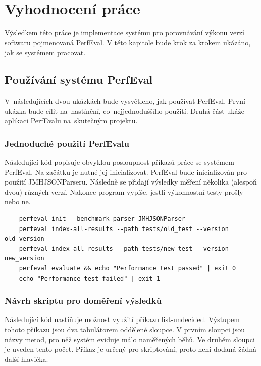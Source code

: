 \chapter{Vyhodnocení práce}

Výsledkem této práce je implementace systému pro porovnávání výkonu verzí softwaru
pojmenovaná PerfEval. V této kapitole bude krok za krokem ukázáno, jak se systémem pracovat.

\section{Používání systému PerfEval}

V~následujících dvou ukázkách bude vysvětleno, jak používat PerfEval. První ukázka bude
cílit na~nastínění, co~nejjednoduššího použití. Druhá část ukáže aplikaci PerfEvalu na~skutečným projektu.

\subsection*{Jednoduché použití PerfEvalu}

Následující kód popisuje obvyklou posloupnost příkazů práce se systémem PerfEval.
Na začátku je nutné jej inicializovat. PerfEval bude inicializován pro použití JMHJSONParseru.
Následně se přidají výsledky měření několika (alespoň dvou) různých verzí.
Nakonec program vypíše, jestli výkonnostní testy prošly nebo ne.

\begin{lstlisting}
    perfeval init --benchmark-parser JMHJSONParser
    perfeval index-all-results --path tests/old_test --version old_version
    perfeval index-all-results --path tests/new_test --version new_version
    perfeval evaluate && echo "Performance test passed" | exit 0
    echo "Performance test failed" | exit 1
\end{lstlisting}

\subsection*{Návrh skriptu pro doměření výsledků}

Následující kód nastiňuje možnost využití příkazu list-undecided. Výstupem tohoto příkazu
jsou dva tabulátorem oddělené sloupce. V prvním sloupci jsou názvy metod, pro něž systém
eviduje málo naměřených běhů. Ve druhém sloupci je uveden tento počet. Příkaz je určený
pro skriptování, proto není dodaná žádná další hlavička.

